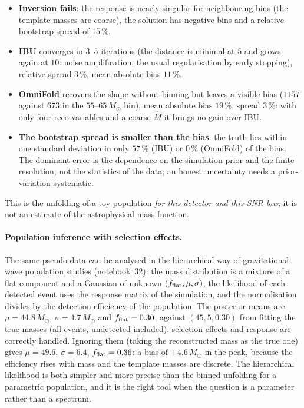 \begin{itemize}[nosep]
\item \textbf{Inversion fails}: the response is nearly singular for neighbouring bins (the template masses are coarse), the solution has negative bins and a relative bootstrap spread of $15\,\%$.
\item \textbf{IBU} converges in $3$--$5$ iterations (the distance is minimal at $5$ and grows again at $10$: noise amplification, the usual regularisation by early stopping), relative spread $3\,\%$, mean absolute bias $11\,\%$.
\item \textbf{OmniFold} recovers the shape without binning but leaves a visible bias ($1157$ against $673$ in the $55$--$65\,M_\odot$ bin), mean absolute bias $19\,\%$, spread $3\,\%$: with only four reco variables and a coarse $\hat M$ it brings no gain over IBU.
\item \textbf{The bootstrap spread is smaller than the bias}: the truth lies within one standard deviation in only $57\,\%$ (IBU) or $0\,\%$ (OmniFold) of the bins. The dominant error is the dependence on the simulation prior and the finite resolution, not the statistics of the data; an honest uncertainty needs a prior-variation systematic.
\end{itemize}
This is the unfolding of a toy population \emph{for this detector and this SNR law}; it is not an estimate of the astrophysical mass function.
\paragraph{Population inference with selection effects.} The same pseudo-data can be analysed in the hierarchical way of gravitational-wave population studies (notebook~32): the mass distribution is a mixture of a flat component and a Gaussian of unknown $(f_{\rm flat},\mu,\sigma)$, the likelihood of each detected event uses the response matrix of the simulation, and the normalisation divides by the detection efficiency of the population. The posterior means are $\mu=44.8\,M_\odot$, $\sigma=4.7\,M_\odot$ and $f_{\rm flat}=0.30$, against $(45,5,0.30)$ from fitting the true masses (all events, undetected included): selection effects and response are correctly handled. Ignoring them (taking the reconstructed mass as the true one) gives $\mu=49.6$, $\sigma=6.4$, $f_{\rm flat}=0.36$: a bias of $+4.6\,M_\odot$ in the peak, because the efficiency rises with mass and the template masses are discrete. The hierarchical likelihood is both simpler and more precise than the binned unfolding for a parametric population, and it is the right tool when the question is a parameter rather than a spectrum.
